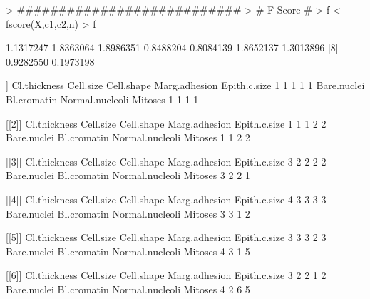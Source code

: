 \documentclass{article}
\begin{document}
\begin{Schunk}
\begin{Sinput}
> ###########################
> # F-Score #
> f <- fscore(X,c1,c2,n)
> f
\end{Sinput}
\begin{Soutput}
[1] 1.1317247 1.8363064 1.8986351 0.8488204 0.8084139 1.8652137 1.3013896
[8] 0.9282550 0.1973198
\end{Soutput}
\end{Schunk}

\begin{Schunk}
\begin{Soutput}
[[1]]
   Cl.thickness       Cell.size      Cell.shape   Marg.adhesion    Epith.c.size 
              1               1               1               1               1 
    Bare.nuclei     Bl.cromatin Normal.nucleoli         Mitoses 
              1               1               1               1 

[[2]]
   Cl.thickness       Cell.size      Cell.shape   Marg.adhesion    Epith.c.size 
              1               1               1               2               2 
    Bare.nuclei     Bl.cromatin Normal.nucleoli         Mitoses 
              1               1               2               2 

[[3]]
   Cl.thickness       Cell.size      Cell.shape   Marg.adhesion    Epith.c.size 
              3               2               2               2               2 
    Bare.nuclei     Bl.cromatin Normal.nucleoli         Mitoses 
              3               2               2               1 

[[4]]
   Cl.thickness       Cell.size      Cell.shape   Marg.adhesion    Epith.c.size 
              4               3               3               3               3 
    Bare.nuclei     Bl.cromatin Normal.nucleoli         Mitoses 
              3               3               1               2 

[[5]]
   Cl.thickness       Cell.size      Cell.shape   Marg.adhesion    Epith.c.size 
              3               3               3               2               3 
    Bare.nuclei     Bl.cromatin Normal.nucleoli         Mitoses 
              4               3               1               5 

[[6]]
   Cl.thickness       Cell.size      Cell.shape   Marg.adhesion    Epith.c.size 
              3               2               2               1               2 
    Bare.nuclei     Bl.cromatin Normal.nucleoli         Mitoses 
              4               2               6               5 


\end{Soutput}
\end{Schunk}
\end{document}
